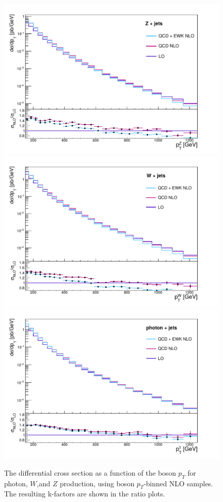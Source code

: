 \begin{figure}[p]
  \centering
 \includegraphics[width=.7\textwidth]{Z_EWK_kfactor.pdf} 
 \includegraphics[width=.7\textwidth]{W_EWK_kfactor.pdf} \\
 \includegraphics[width=.7\textwidth]{gamma_EWK_kfactor.pdf} 
 \caption{The differential cross section as a function of the boson $p_T$ for photon, $W$,and $Z$ production, using boson $p_T$-binned \ac{NLO} samples. The resulting k-factors are shown in the ratio plots.}
 \label{fig:kfactors}
\end{figure}

